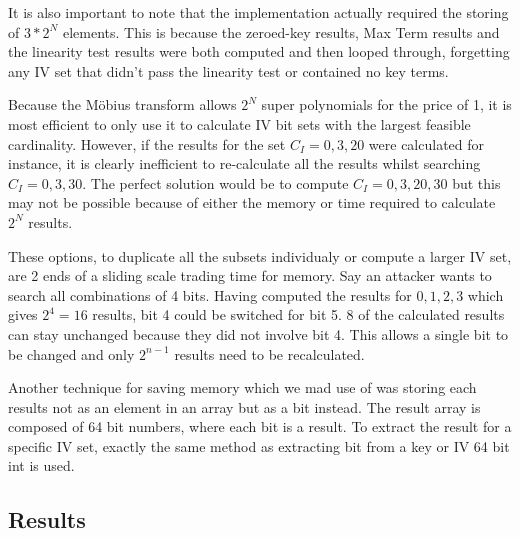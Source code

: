 \documentclass{report}
\let\Oldsubsection\subsection
\renewcommand{\subsection}{\FloatBarrier\Oldsubsection}
\begin{document}
It is also important to note that the implementation actually required the storing of $3*2^N$ elements. This is because the zeroed-key results, Max Term results and the linearity test results were both computed and then looped through, forgetting any IV set that didn't pass the linearity test or contained no key terms.

Because the Möbius transform allows $2^N$ super polynomials for the price of 1, it is most efficient to only use it to calculate IV bit sets with the largest feasible cardinality. However, if the results for the set $C_I={0,3,20}$ were calculated for instance, it is clearly inefficient to re-calculate all the results whilst searching $C_I={0,3,30}$. The perfect solution would be to compute $C_I={0,3,20,30}$ but this may not be possible because of either the memory or time required to calculate $2^N$ results.

These options, to duplicate all the subsets individualy or compute a larger IV set, are 2 ends of a sliding scale trading time for memory. Say an attacker wants to search all combinations of 4 bits. Having computed the results for ${0,1,2,3}$ which gives $2^4=16$ results, bit 4 could be switched for bit 5. 8 of the calculated results can stay unchanged because they did not involve bit 4. This allows a single bit to be changed and only $2^{n-1}$ results need to be recalculated.

Another technique for saving memory which we mad use of was storing each results not as an element in an array but as a bit instead. The result array is composed of 64 bit numbers, where each bit is a result. To extract the result for a specific IV set, exactly the same method as extracting bit from a key or IV 64 bit int is used.

\subsection{Results}
\end{document}
